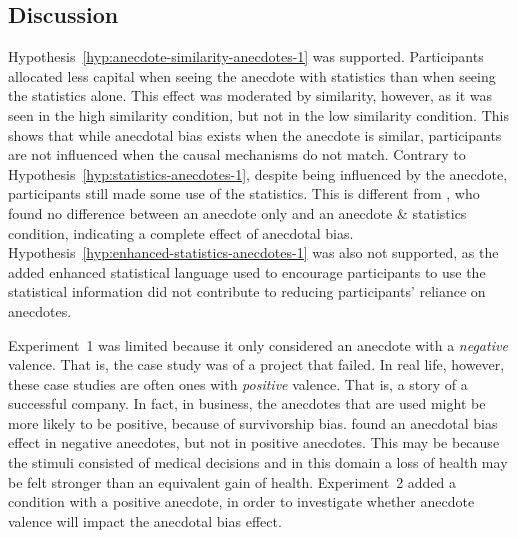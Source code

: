 \documentclass[a4paper, nobind, dvipsnames]{templates/ociamthesis}
\theoremstyle{definition}
\theoremstyle{definition}
\theoremstyle{definition}
\theoremstyle{definition}
\theoremstyle{remark}
\begin{document}
\subsection{Discussion}

Hypothesis~\ref{hyp:anecdote-similarity-anecdotes-1} was supported.
Participants allocated less capital when seeing the anecdote with statistics
than when seeing the statistics alone. This effect was moderated by similarity,
however, as it was seen in the high similarity condition, but not in the low
similarity condition. This shows that while anecdotal bias exists when the
anecdote is similar, participants are not influenced when the causal mechanisms
do not match. Contrary to Hypothesis~\ref{hyp:statistics-anecdotes-1}, despite
being influenced by the anecdote, participants still made some use of the
statistics. This is different from \textcite{wainberg2013}, who found no difference
between an anecdote only and an anecdote \& statistics condition, indicating a
complete effect of anecdotal bias.
Hypothesis~\ref{hyp:enhanced-statistics-anecdotes-1} was also not supported, as
the added enhanced statistical language used to encourage participants to use
the statistical information did not contribute to reducing participants'
reliance on anecdotes.

Experiment~1 was limited because it only considered an anecdote with a
\emph{negative} valence. That is, the case study was of a project that failed. In
real life, however, these case studies are often ones with \emph{positive} valence.
That is, a story of a successful company. In fact, in business, the anecdotes
that are used might be more likely to be positive, because of survivorship bias.
\textcite{jaramillo2019} found an anecdotal bias effect in negative anecdotes, but not in
positive anecdotes. This may be because the stimuli consisted of medical
decisions and in this domain a loss of health may be felt stronger than an
equivalent gain of health. Experiment~2 added a condition with a positive
anecdote, in order to investigate whether anecdote valence will impact the
anecdotal bias effect.
\end{document}
